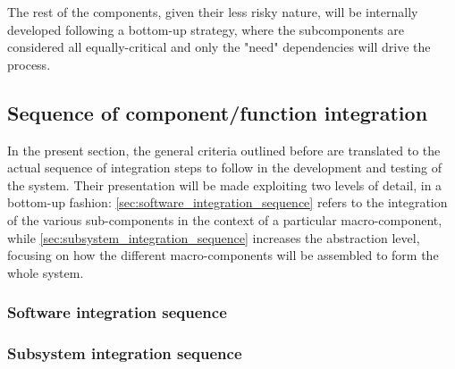 	The rest of the components, given their less risky nature, will be internally developed following a bottom-up strategy, where the subcomponents are considered all equally-critical and only the "need" dependencies will drive the process.

\subsection{Sequence of component/function integration}
	In the present section, the general criteria outlined before are translated to the actual sequence of integration steps to follow in the development and testing of the system. Their presentation will be made exploiting two levels of detail, in a bottom-up fashion: \autoref{sec:software_integration_sequence} refers to the integration of the various sub-components in the context of a particular macro-component, while \autoref{sec:subsystem_integration_sequence} increases the abstraction level, focusing on how the different macro-components will be assembled to form the whole system.

	\subsubsection{Software integration sequence}
	\label{sec:software_integration_sequence}

	\subsubsection{Subsystem  integration  sequence}
	\label{sec:subsystem_integration_sequence}
